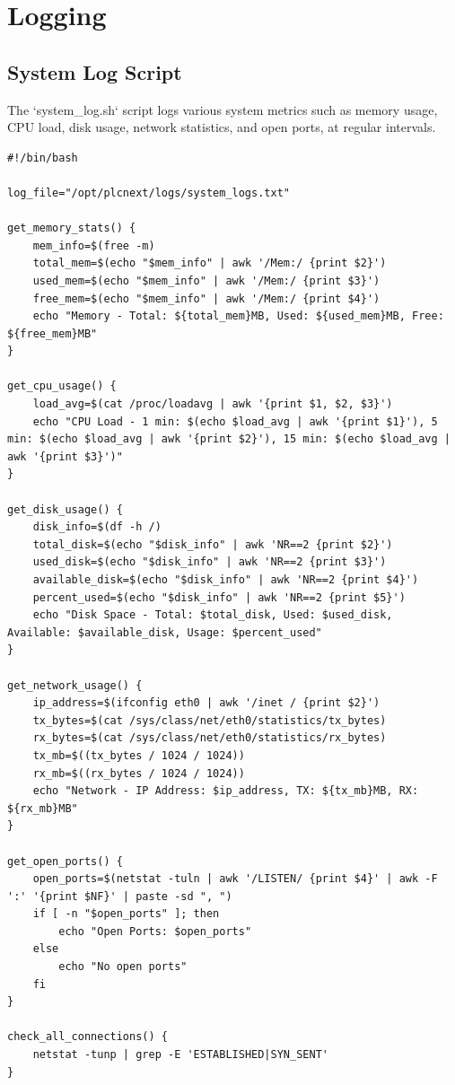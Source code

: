 \documentclass[Master,BMR,english]{twbook}
\begin{document}
\section{Logging}
\label{sec:logging_scripts}

\subsection{System Log Script}
The `system\_log.sh` script logs various system metrics such as memory usage, CPU load, disk usage, network statistics, and open ports, at regular intervals.

\begin{verbatim}
#!/bin/bash

log_file="/opt/plcnext/logs/system_logs.txt"

get_memory_stats() {
    mem_info=$(free -m)
    total_mem=$(echo "$mem_info" | awk '/Mem:/ {print $2}')
    used_mem=$(echo "$mem_info" | awk '/Mem:/ {print $3}')
    free_mem=$(echo "$mem_info" | awk '/Mem:/ {print $4}')
    echo "Memory - Total: ${total_mem}MB, Used: ${used_mem}MB, Free: ${free_mem}MB"
}

get_cpu_usage() {
    load_avg=$(cat /proc/loadavg | awk '{print $1, $2, $3}')
    echo "CPU Load - 1 min: $(echo $load_avg | awk '{print $1}'), 5 min: $(echo $load_avg | awk '{print $2}'), 15 min: $(echo $load_avg | awk '{print $3}')"
}

get_disk_usage() {
    disk_info=$(df -h /)
    total_disk=$(echo "$disk_info" | awk 'NR==2 {print $2}')
    used_disk=$(echo "$disk_info" | awk 'NR==2 {print $3}')
    available_disk=$(echo "$disk_info" | awk 'NR==2 {print $4}')
    percent_used=$(echo "$disk_info" | awk 'NR==2 {print $5}')
    echo "Disk Space - Total: $total_disk, Used: $used_disk, Available: $available_disk, Usage: $percent_used"
}

get_network_usage() {
    ip_address=$(ifconfig eth0 | awk '/inet / {print $2}')
    tx_bytes=$(cat /sys/class/net/eth0/statistics/tx_bytes)
    rx_bytes=$(cat /sys/class/net/eth0/statistics/rx_bytes)
    tx_mb=$((tx_bytes / 1024 / 1024))
    rx_mb=$((rx_bytes / 1024 / 1024))
    echo "Network - IP Address: $ip_address, TX: ${tx_mb}MB, RX: ${rx_mb}MB"
}

get_open_ports() {
    open_ports=$(netstat -tuln | awk '/LISTEN/ {print $4}' | awk -F ':' '{print $NF}' | paste -sd ", ")
    if [ -n "$open_ports" ]; then
        echo "Open Ports: $open_ports"
    else
        echo "No open ports"
    fi
}

check_all_connections() {
    netstat -tunp | grep -E 'ESTABLISHED|SYN_SENT'
}


\end{verbatim}
\end{document}
